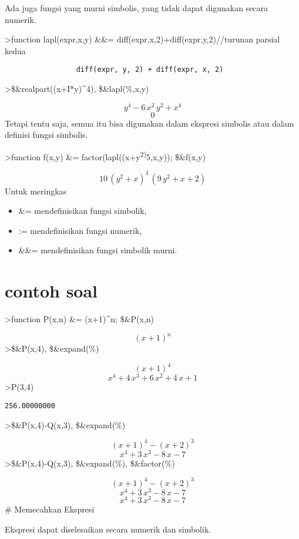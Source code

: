 \documentclass[
]{book}
\begin{document}
Ada juga fungsi yang murni simbolis, yang tidak dapat digunakan secara numerik.

\textgreater function lapl(expr,x,y) \&\&= diff(expr,x,2)+diff(expr,y,2)//turunan parsial kedua

\begin{verbatim}
                 diff(expr, y, 2) + diff(expr, x, 2)
\end{verbatim}

\textgreater\$\&realpart((x+I*y)\^{}4), \$\&lapl(\%,x,y)

\[y^4-6\,x^2\,y^2+x^4\]\[0\]Tetapi tentu saja, semua itu bisa digunakan dalam ekspresi simbolis atau dalam definisi fungsi simbolis.

\textgreater function f(x,y) \&= factor(lapl((x+y\textsuperscript{2)}5,x,y)); \$\&f(x,y)

\[10\,\left(y^2+x\right)^3\,\left(9\,y^2+x+2\right)\]Untuk meringkas

\begin{itemize}
\item
  \&= mendefinisikan fungsi simbolik,
\item
  := mendefinisikan fungsi numerik,
\item
  \&\&= mendefinisikan fungsi simbolik murni.
\end{itemize}

\section{contoh soal}\label{contoh-soal-7}

\textgreater function P(x,n) \&= (x+1)\^{}n; \$\&P(x,n)

\[\left(x+1\right)^{n}\]\textgreater\$\&P(x,4), \$\&expand(\%)

\[\left(x+1\right)^4\]\[x^4+4\,x^3+6\,x^2+4\,x+1\]\textgreater P(3,4)

\begin{verbatim}
256.00000000 
\end{verbatim}

\textgreater\$\&P(x,4)-Q(x,3), \$\&expand(\%)

\[\left(x+1\right)^4-\left(x+2\right)^3\]\[x^4+3\,x^3-8\,x-7\]\textgreater\$\&P(x,4)-Q(x,3), \$\&expand(\%), \$\&factor(\%)

\[\left(x+1\right)^4-\left(x+2\right)^3\]\[x^4+3\,x^3-8\,x-7\]\[x^4+3\,x^3-8\,x-7\]\# Memecahkan Ekspresi

Ekspresi dapat diselesaikan secara numerik dan simbolik.
\end{document}
